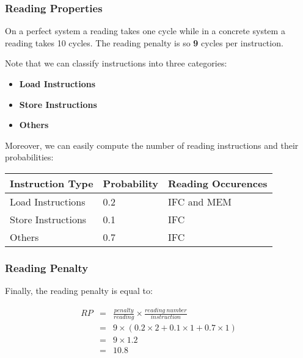 \begin{frame}
  \frametitle{Reading Properties}

  On a perfect system a reading takes one cycle while in a concrete system
  a reading takes 10 cycles. The reading penalty is so \textbf{9} cycles
  per instruction.

  \-

  Note that we can classify instructions into three categories:

  \begin{itemize}
    \item
      \textbf{Load Instructions}
    \item
      \textbf{Store Instructions}
    \item
      \textbf{Others}
  \end{itemize}

  Moreover, we can easily compute the number of reading instructions and
  their probabilities:

  \begin{tabular}{|p{3cm}|p{3cm}|p{3cm}|}
    \hline

    \textbf{Instruction Type} & \textbf{Probability} &
    \textbf{Reading Occurences} \\

    \hline

    Load Instructions & 0.2 & IFC and MEM \\

    \hline

    Store Instructions & 0.1 & IFC \\

    \hline

    Others & 0.7 & IFC \\

    \hline
  \end{tabular}
\end{frame}


\begin{frame}
  \frametitle{Reading Penalty}

  Finally, the reading penalty is equal to:

  \-

  \begin{eqnarray*}
    RP & = & \frac{penalty}{reading} \times
             \frac{reading~number}{instruction} \\
       & = & 9 \times (0.2 \times 2 + 0.1 \times 1 + 0.7 \times 1) \\
       & = & 9 \times 1.2 \\
       & = & 10.8
  \end{eqnarray*}
\end{frame}


